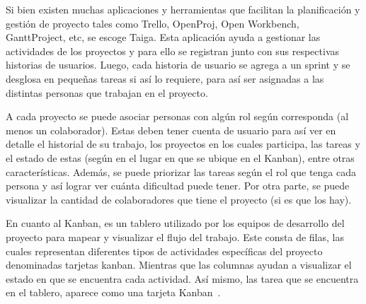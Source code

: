 Si bien existen muchas aplicaciones y herramientas que facilitan la planificación y gestión de proyecto tales como Trello, OpenProj, Open Workbench, GanttProject, etc, se escoge Taiga. Esta aplicación ayuda a gestionar las actividades de los proyectos y para ello se registran junto con sus respectivas historias de usuarios. Luego, cada historia de usuario se agrega a un sprint y se desglosa en pequeñas tareas si así lo requiere, para así ser asignadas a las distintas personas que trabajan en el proyecto.

A cada proyecto se puede asociar personas con algún rol según corresponda (al menos un colaborador). Estas deben tener cuenta de usuario para así ver en detalle el historial de su trabajo, los proyectos en los cuales participa, las tareas y el estado de estas (según en el lugar en que se ubique en el Kanban), entre otras características. Además, se puede priorizar las tareas según el rol que tenga cada persona y así lograr ver cuánta dificultad puede tener. Por otra parte, se puede visualizar la cantidad de colaboradores que tiene el proyecto (si es que los hay).

En cuanto al Kanban, es un tablero utilizado por los equipos de desarrollo del proyecto para mapear y visualizar el flujo del trabajo. Este consta de filas, las cuales representan diferentes tipos de actividades específicas del proyecto denominadas tarjetas kanban. Mientras que las columnas ayudan a visualizar el estado en que se encuentra cada actividad. Así mismo, las tarea que se encuentra en el tablero, aparece como una tarjeta Kanban~\cite{19}.

